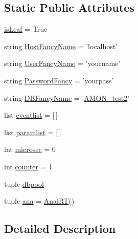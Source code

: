 \subsection*{Static Public Attributes}
\begin{DoxyCompactItemize}
\item 
\hyperlink{classnetwork_1_1amon__server__post_1_1_event_page_a2c4039685dcc225adc4c2a998ebdbc97}{is\-Leaf} = True
\item 
string \hyperlink{classnetwork_1_1amon__server__post_1_1_event_page_ab2d4c291eb38394dd80dc0da415bc8f7}{Host\-Fancy\-Name} = 'localhost'
\item 
string \hyperlink{classnetwork_1_1amon__server__post_1_1_event_page_a99e287cd9a0c3fa9663a18101606fe7c}{User\-Fancy\-Name} = 'yourname'
\item 
string \hyperlink{classnetwork_1_1amon__server__post_1_1_event_page_abf3ce23699c9adfa3508cda1192998c1}{Password\-Fancy} = 'yourpass'
\item 
string \hyperlink{classnetwork_1_1amon__server__post_1_1_event_page_ab13a95bbc99fa0136f178e8dfb59a32d}{D\-B\-Fancy\-Name} = '\hyperlink{db__mc__build_8sql_a19c21c59303d8b6591b92240ff7de1d5}{A\-M\-O\-N\-\_\-test2}'
\item 
list \hyperlink{classnetwork_1_1amon__server__post_1_1_event_page_a758c79966f818aa356316d87052f9c2e}{eventlist} = \mbox{[}$\,$\mbox{]}
\item 
list \hyperlink{classnetwork_1_1amon__server__post_1_1_event_page_a11cfef0e995347ffe8571f8be4dbc41a}{paramlist} = \mbox{[}$\,$\mbox{]}
\item 
int \hyperlink{classnetwork_1_1amon__server__post_1_1_event_page_ac1ec0da9b3424978570e5327b65cbbcc}{microsec} = 0
\item 
int \hyperlink{classnetwork_1_1amon__server__post_1_1_event_page_aa2d1165df8829699de38f4047d8d9b3c}{counter} = 1
\item 
tuple \hyperlink{classnetwork_1_1amon__server__post_1_1_event_page_a27945808b5c4a8cdcde134a10df4965d}{dbpool}
\item 
tuple \hyperlink{classnetwork_1_1amon__server__post_1_1_event_page_acba345bc67164b2162236da6498a94f5}{ana} = \hyperlink{classanalyser_1_1runanal_1_1_anal_r_t}{Anal\-R\-T}()
\end{DoxyCompactItemize}


\subsection{Detailed Description}


